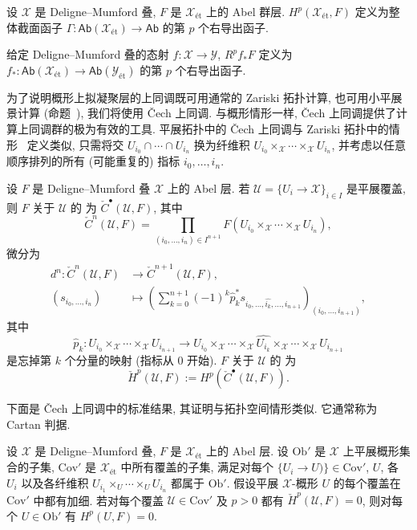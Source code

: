 \begin{definition}[上同调]\label{src:5.1.36}
设 $\mathcal X$ 是 Deligne--Mumford 叠, $F$ 是 $\mathcal X_{\text{ét}}$ 上的 Abel 群层.  $H^p(\mathcal X_{\text{ét}},F)$ 定义为整体截面函子 $\Gamma:\mathsf{Ab}(\mathcal X_{\text{ét}})\to\mathsf{Ab}$ 的第 $p$ 个右导出函子.

给定 Deligne--Mumford 叠的态射 $f:\mathcal X\to\mathcal Y$,  $R^pf_*F$ 定义为 $f_*:\mathsf{Ab}(\mathcal X_{\text{ét}})\to\mathsf{Ab}(\mathcal Y_{\text{ét}})$ 的第 $p$ 个右导出函子.
\end{definition}
为了说明概形上拟凝聚层的上同调既可用通常的 Zariski 拓扑计算, 也可用小平展景计算 (命题~), 我们将使用 Čech 上同调. 与概形情形一样, Čech 上同调提供了计算上同调群的极为有效的工具. 平展拓扑中的 Čech 上同调与 Zariski 拓扑中的情形~\cite[III.4]{Har77} 定义类似, 只需将交 $U_{i_0}\cap\cdots\cap U_{i_n}$ 换为纤维积 $U_{i_0}\times_{\mathcal X}\cdots\times_{\mathcal X}U_{i_n}$, 并考虑以任意顺序排列的所有 (可能重复的) 指标 $i_0,\ldots,i_n$.
\begin{definition}\label{src:5.1.37}
设 $F$ 是 Deligne--Mumford 叠 $\mathcal X$ 上的 Abel 层. 若 $\mathcal U=\{U_i\to\mathcal X\}_{i\in I}$ 是平展覆盖, 则 $F$ 关于 $\mathcal U$ 的 为 $\check C^\bullet(\mathcal U,F)$, 其中
\[
\check C^n(\mathcal U,F)=\prod_{(i_0,\ldots,i_n)\in I^{n+1}}F(U_{i_0}\times_{\mathcal X}\cdots\times_{\mathcal X}U_{i_n}),
\]
微分为
\[
\begin{aligned}
d^n:\check C^n(\mathcal U,F)&\longrightarrow\check C^{n+1}(\mathcal U,F),\\
(s_{i_0,\ldots,i_n})&\longmapsto\left(\sum_{k=0}^{n+1}(-1)^k\widehat p_k^*s_{i_0,\ldots,\widehat{i_k},\ldots,i_{n+1}}\right)_{(i_0,\ldots,i_{n+1})},
\end{aligned}
\]
其中
\[
\widehat p_k:U_{i_0}\times_{\mathcal X}\cdots\times_{\mathcal X}U_{i_{n+1}}\longrightarrow U_{i_0}\times_{\mathcal X}\cdots\times_{\mathcal X}\widehat{U_{i_k}}\times_{\mathcal X}\cdots\times_{\mathcal X}U_{i_{n+1}}
\]
是忘掉第 $k$ 个分量的映射 (指标从 $0$ 开始). $F$ 关于 $\mathcal U$ 的 为
\[
\check H^p(\mathcal U,F):=H^p(\check C^\bullet(\mathcal U,F)).
\]
\end{definition}
下面是 Čech 上同调中的标准结果, 其证明与拓扑空间情形类似. 它通常称为 Cartan 判据.
\begin{lemma}\label{src:5.1.38}
设 $\mathcal X$ 是 Deligne--Mumford 叠, $F$ 是 $\mathcal X_{\text{ét}}$ 上的 Abel 层. 设 $\mathrm{Ob}'$ 是 $\mathcal X$ 上平展概形集合的子集, $\mathrm{Cov}'$ 是 $\mathcal X_{\text{ét}}$ 中所有覆盖的子集, 满足对每个 $\{U_i\to U)\}\in\mathrm{Cov}'$, $U$, 各 $U_i$ 以及各纤维积 $U_{i_1}\times_U\cdots\times_U U_{i_n}$ 都属于 $\mathrm{Ob}'$. 假设平展 $\mathcal X$-概形 $U$ 的每个覆盖在 $\mathrm{Cov}'$ 中都有加细. 若对每个覆盖 $\mathcal U\in\mathrm{Cov}'$ 及 $p>0$ 都有 $\check H^p(\mathcal U,F)=0$, 则对每个 $U\in\mathrm{Ob}'$ 有 $H^p(U,F)=0$.
\end{lemma}
